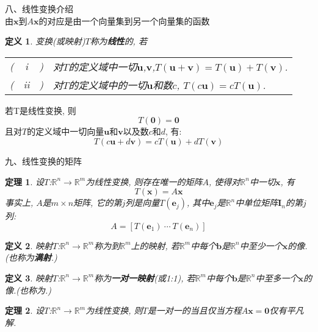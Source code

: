 \documentclass[UTF8,fontset=ubuntu]{ctexart}
\theoremstyle{nonumberplain}
\newtheorem{definition}{定义}
\theoremstyle{break}
\newtheorem{theorem}{定理}
\theoremstyle{empty}
\begin{document}
八、线性变换介绍\\[1ex]
由$\bm{x}$到$A\bm{x}$的对应是由一个向量集到另一个向量集的函数\\[2ex]

\begin{definition}
变换(或映射)$T$称为\textbf{线性}的, 若\\
\begin{tabular}{l@{}c@{}l@{}l}
( & i & ) & 对$T$的定义域中一切$\bm{u}$,$\bm{v}$,$T(\bm{u}+\bm{v})=T(\bm{u})+T(\bm{v})$.\\
( & ii & ) & 对$T$的定义域中的一切$\bm{u}$和数$c$, $T(c\bm{u})=cT(\bm{u})$.
\end{tabular}
\end{definition}\vspace{4ex}

\begin{law}
若T是线性变换, 则
\[T(\bm{0})=\bm{0}\]
且对$T$的定义域中一切向量$\bm{u}$和$\bm{v}$以及数$c$和$d$, 有:
\[T(c\bm{u}+d\bm{v})=cT(\bm{u})+dT(\bm{v})\]
\end{law}\vspace{6ex}

九、线性变换的矩阵\\[-2ex]
\begin{theorem}
设$T$:$\mathbb{R}^n\rightarrow\mathbb{R}^m$为线性变换, 则存在唯一的矩阵$A$, 使得对$\mathbb{R}^n$中一切$\bm{x}$, 有
\[T(\bm{x})=A\bm{x}\]
事实上, $A$是$m\times n$矩阵, 它的第$j$列是向量$T(\bm{e}_j)$, 其中$\bm{e}_j$是$\mathbb{R}^n$中单位矩阵$\bm{I}_n$的第$j$列:
\[A=[T(\bm{e}_1)\ \cdots\ T(\bm{e}_n)]\]
\end{theorem}\vspace{4ex}

\begin{definition}
映射$T$:$\mathbb{R}^n\rightarrow\mathbb{R}^m$称为到$\mathbb{R}^m$上的映射, 若$\mathbb{R}^m$中每个$\bm{b}$是$\mathbb{R}^n$中至少一个$\bm{x}$的像.(也称为\textbf{满射}.)
\end{definition}\vspace{4ex}

\begin{definition}
映射$T$:$\mathbb{R}^n\rightarrow\mathbb{R}^m$称为\textbf{一对一映射}(或1:1), 若$\mathbb{R}^m$中每个$\bm{b}$是$\mathbb{R}^n$中至多一个$\bm{x}$的像.(也称为.)
\end{definition}\vspace{4ex}

\begin{theorem}
设$T$:$\mathbb{R}^n\rightarrow\mathbb{R}^m$为线性变换, 则$T$是一对一的当且仅当方程$A\bm{x}=\bm{0}$仅有平凡解.
\end{theorem}\vspace{4ex}
\end{document}
